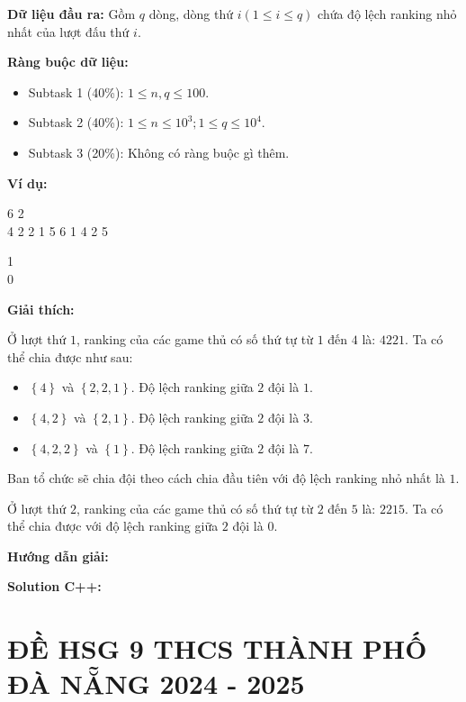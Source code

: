 \documentclass[12pt]{scrartcl}  %
\begin{document}
\textbf{Dữ liệu đầu ra:}
Gồm $q$ dòng, dòng thứ $i (1 \leq i \leq q)$ chứa độ lệch ranking nhỏ nhất của lượt đấu thứ $i$.

\textbf{Ràng buộc dữ liệu:}
\begin{itemize}
    \item Subtask 1 (40\%): $1 \leq n, q \leq 100$.
    \item Subtask 2 (40\%): $1 \leq n \leq 10^3; 1 \leq q \leq 10^4$.
    \item Subtask 3 (20\%): Không có ràng buộc gì thêm.
\end{itemize}

\textbf{Ví dụ:}
\begin{tcolorbox}[colback=gray!5!white, colframe=blue!50!black, title=Input]
6 2\\
4 2 2 1 5 6
1 4
2 5
\end{tcolorbox}

\begin{tcolorbox}[colback=gray!5!white, colframe=green!50!black, title=Output]
1\\
0
\end{tcolorbox}

\textbf{Giải thích:}

Ở lượt thứ $1$, ranking của các game thủ có số thứ tự từ $1$ đến $4$ là: $4 2 2 1$. Ta có thể chia được như sau:

\begin{itemize}
    \item $\left\{ 4 \right\}$ và $\left\{ 2, 2, 1 \right\}$. Độ lệch ranking giữa $2$ đội là $1$. 
    \item $\left\{ 4, 2 \right\}$ và $\left\{ 2, 1 \right\}$. Độ lệch ranking giữa $2$ đội là $3$. 
    \item $\left\{ 4, 2, 2 \right\}$ và $\left\{ 1 \right\}$. Độ lệch ranking giữa $2$ đội là $7$.
\end{itemize}

Ban tổ chức sẽ chia đội theo cách chia đầu tiên với độ lệch ranking nhỏ nhất là $1$.

Ở lượt thứ $2$, ranking của các game thủ có số thứ tự từ $2$ đến $5$ là: $2 2 1 5$. Ta có thể chia được với độ lệch ranking giữa $2$ đội là $0$.

\textbf{Hướng dẫn giải:}

\textbf{Solution C++:}

\section{ĐỀ HSG 9 THCS THÀNH PHỐ ĐÀ NẴNG 2024 - 2025}
\end{document}
